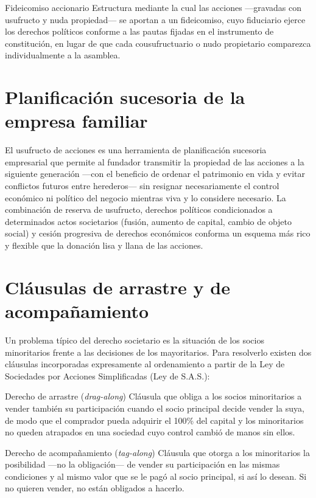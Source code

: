 \documentclass[12pt,oneside]{book}
\begin{document}
\begin{definition}{Fideicomiso accionario}
Estructura mediante la cual las acciones ---gravadas con usufructo y nuda propiedad--- se aportan a un fideicomiso, cuyo fiduciario ejerce los derechos políticos conforme a las pautas fijadas en el instrumento de constitución, en lugar de que cada cousufructuario o nudo propietario comparezca individualmente a la asamblea.
\end{definition}

\section{Planificación sucesoria de la empresa familiar}

El usufructo de acciones es una herramienta de planificación sucesoria empresarial que permite al fundador transmitir la propiedad de las acciones a la siguiente generación ---con el beneficio de ordenar el patrimonio en vida y evitar conflictos futuros entre herederos--- sin resignar necesariamente el control económico ni político del negocio mientras viva y lo considere necesario. La combinación de reserva de usufructo, derechos políticos condicionados a determinados actos societarios (fusión, aumento de capital, cambio de objeto social) y cesión progresiva de derechos económicos conforma un esquema más rico y flexible que la donación lisa y llana de las acciones.

\section{Cláusulas de arrastre y de acompañamiento}
\label{sec:dragtag}

Un problema típico del derecho societario es la situación de los socios minoritarios frente a las decisiones de los mayoritarios. Para resolverlo existen dos cláusulas incorporadas expresamente al ordenamiento a partir de la Ley de Sociedades por Acciones Simplificadas (Ley de S.A.S.):

\begin{definition}{Derecho de arrastre (\emph{drag-along})}
Cláusula que obliga a los socios minoritarios a vender también su participación cuando el socio principal decide vender la suya, de modo que el comprador pueda adquirir el 100\% del capital y los minoritarios no queden atrapados en una sociedad cuyo control cambió de manos sin ellos.
\end{definition}

\begin{definition}{Derecho de acompañamiento (\emph{tag-along})}
Cláusula que otorga a los minoritarios la posibilidad ---no la obligación--- de vender su participación en las mismas condiciones y al mismo valor que se le pagó al socio principal, si así lo desean. Si no quieren vender, no están obligados a hacerlo.
\end{definition}
\end{document}
